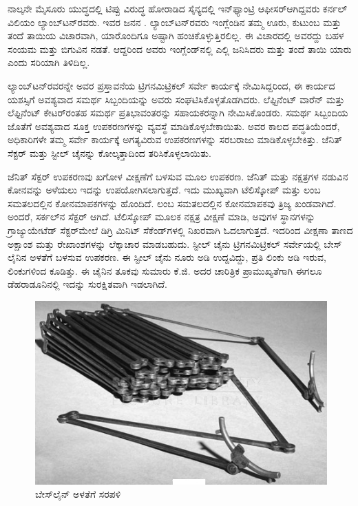 ನಾಲ್ಕನೇ ಮೈಸೂರು ಯುದ್ಧದಲ್ಲಿ ಟಿಪ್ಪು ವಿರುದ್ಧ ಹೋರಾಡಿದ ಸೈನ್ಯದಲ್ಲಿ ಇನ್​ಫ್ಯಾಂಟ್ರಿ ಆಫೀಸರ್​ ಆಗಿದ್ದವರು ಕರ್ನಲ್​ ವಿಲಿಯಂ ಲ್ಯಾಂಬ್​ಟನ್​ರವರು. ಇವರ ಜನನ . ಲ್ಯಾಂಬ್​ಟನ್​ರವರು ಇಂಗ್ಲೆಂಡಿನ ತಮ್ಮ ಊರು, ಕುಟುಂಬ ಮತ್ತು ತಂದೆ ತಾಯಿಯ ವಿಚಾರವಾಗಿ, ಯಾರೊಂದಿಗೂ ಅಷ್ಟಾಗಿ ಹಂಚಿಕೊಳ್ಳುತ್ತಿರಲಿಲ್ಲ. ಈ ವಿಚಾರದಲ್ಲಿ ಅವರದ್ದು ಬಹಳ ಸಂಯಮ ಮತ್ತು ಬಿಗುವಿನ ನಡತೆ. ಆದ್ದರಿಂದ ಅವರು ಇಂಗ್ಲೆಂಡ್​ನಲ್ಲಿ ಎಲ್ಲಿ ಜನಿಸಿದರು ಮತ್ತು ತಂದೆ ತಾಯಿ ಯಾರು ಎಂದು ಸರಿಯಾಗಿ ತಿಳಿದಿಲ್ಲ.

ಲ್ಯಾಂಬ್​ಟನ್​ರವರನ್ನೇ ಅವರ ಪ್ರಸ್ತಾವನೆಯ ಟ್ರಿಗನಮಿಟ್ರಿಕಲ್​ ಸರ್ವೇ ಕಾರ್ಯಕ್ಕೆ ನೇಮಿಸಿದ್ದರಿಂದ, ಈ ಕಾರ್ಯದ ಯಶಸ್ಸಿಗೆ ಅವಶ್ಯವಾದ ಸಮರ್ಥ ಸಿಬ್ಬಂದಿಯನ್ನು ಅವರು ಸಂಘಟಿಸಿಕೊಳ್ಳತೊಡಗಿದರು. ಲೆಫ್ಟಿನೆಂಟ್​ ವಾರೆನ್​ ಮತ್ತು ಲೆಫ್ಟಿನೆಂಟ್​ ಕೇಟರ್​ರಂತಹ ಸಮರ್ಥ ಪ್ರತಿಭಾವಂತರನ್ನು ಸಹಾಯಕರನ್ನಾಗಿ ನೇಮಿಸಿಕೊಂಡರು. ಸಮರ್ಥ ಸಿಬ್ಬಂದಿಯ ಜೊತೆಗೆ ಅವಶ್ಯವಾದ ಸೂಕ್ತ ಉಪಕರಣಗಳನ್ನು ವ್ಯವಸ್ಥೆ ಮಾಡಿಕೊಳ್ಳಬೇಕಾಯಿತು. ಅವರ ಕಾಲದ ಪದ್ಧತಿಯೆಂದರೆ, ಅಧಿಕಾರಿಗಳೇ ತಮ್ಮ ಸರ್ವೇ ಕಾರ್ಯಕ್ಕೆ ಅಗತ್ಯವಿರುವ ಉಪಕರಣಗಳನ್ನು ಸರಬರಾಜು ಮಾಡಿಕೊಳ್ಳಬೇಕಿತ್ತು. ಜೆನಿತ್​ ಸೆಕ್ಟರ್​ ಮತ್ತು ಸ್ಟೀಲ್​ ಚೈನನ್ನು ಕೋಲ್ಕತ್ತಾದಿಂದ ತರಿಸಿಕೊಳ್ಳಲಾಯಿತು.

ಜೆನಿತ್​ ಸೆಕ್ಟರ್​ ಉಪಕರಣವು ಖಗೋಳ ವೀಕ್ಷಣೆಗೆ ಬಳಸುವ ಮೂಲ ಉಪಕರಣ. ಜೆನಿತ್​ ಮತ್ತು ನಕ್ಷತ್ರಗಳ ನಡುವಿನ ಕೋನವನ್ನು ಅಳೆಯಲು ಇದನ್ನು ಉಪಯೋಗಿಸಲಾಗುತ್ತದೆ. ಇದು ಮುಖ್ಯವಾಗಿ ಟೆಲಿಸ್ಕೋಪ್​ ಮತ್ತು ಲಂಬ ಸಮತಲದಲ್ಲಿನ ಕೋನಮಾಪಕಗಳನ್ನು ಹೊಂದಿದೆ. ಲಂಬ ಸಮತಲದಲ್ಲಿನ ಕೋನಮಾಪಕವು ತ್ರಿಜ್ಯ ಖಂಡವಾಗಿದೆ. ಅಂದರೆ, ಸರ್ಕಲ್​ನ ಸೆಕ್ಟರ್​ ಆಗಿದೆ. ಟೆಲಿಸ್ಕೋಪ್​ ಮೂಲಕ ನಕ್ಷತ್ರ ವೀಕ್ಷಣೆ ಮಾಡಿ, ಅವುಗಳ ಸ್ಥಾನಗಳನ್ನು ಗ್ರಾಜ್ಯುಯೇಟೆಡ್​ ಸೆಕ್ಟರ್​ ಮೇಲೆ ಡಿಗ್ರಿ ಮಿನಿಟ್​ ಸೆಕೆಂಡ್​ಗಳಲ್ಲಿ ನಿಖರವಾಗಿ ಓದಲಾಗುತ್ತದೆ. ಇದರಿಂದ ವೀಕ್ಷಣಾ ತಾಣದ ಅಕ್ಷಾಂಶ ಮತ್ತು ರೇಖಾಂಶಗಳನ್ನು ಲೆಕ್ಕಾಚಾರ ಮಾಡಬಹುದು. ಸ್ಟೀಲ್​ ಚೈನು ಟ್ರಿಗನಮಿಟ್ರಿಕಲ್​ ಸರ್ವೇಯಲ್ಲಿ ಬೇಸ್​ಲೈನಿನ ಅಳತೆಗೆ ಬಳಸುವ ಉಪಕರಣ. ಈ ಸ್ಟೀಲ್​ ಚೈನು ನೂರು ಅಡಿ ಉದ್ದವಿದ್ದು, ಪ್ರತಿ ಲಿಂಕು  ಅಡಿ ಇರುವ,  ಲಿಂಕುಗಳಿಂದ ಕೂಡಿತ್ತು. ಈ ಚೈನಿನ ತೂಕವು ಸುಮಾರು  ಕೆ.ಜಿ. ಅದರ ಚಾರಿತ್ರಿಕ ಪ್ರಾಮುಖ್ಯತೆಗಾಗಿ ಈಗಲೂ ಡೆಹರಾಡೂನಿನಲ್ಲಿ ಇದನ್ನು ಸುರಕ್ಷಿತವಾಗಿ ಇಡಲಾಗಿದೆ.

\begin{figure}[!htbp]
\includegraphics[scale=1.5]{"images/image006.jpg"}
\caption{ಬೇಸ್‌ಲೈನ್ ಅಳತೆಗೆ ಸರಪಳಿ}\label{chap4-fig2}
\end{figure}

